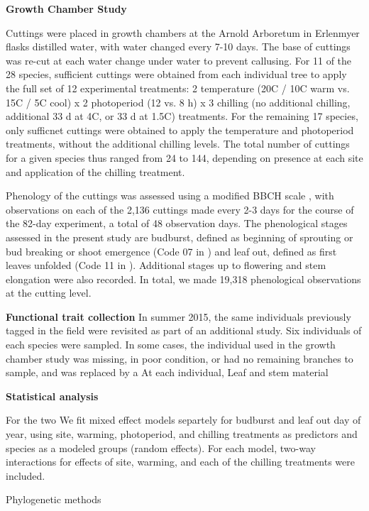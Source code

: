 \documentclass[12pt]{article}
\begin{document}
\textbf{Growth Chamber Study}

Cuttings were placed in growth chambers at the Arnold Arboretum in Erlenmyer flasks distilled water, with water changed every 7-10 days. The base of cuttings was re-cut at each water change under water to prevent callusing. For 11 of the 28 species, sufficient cuttings were obtained from each individual tree to apply the full set of 12 experimental treatments: 2 temperature (20\degree C / 10\degree C warm vs. 15\degree C / 5\degree C cool) x 2 photoperiod (12 vs. 8 h) x 3 chilling (no additional chilling,  additional 33 d at 4\degree C, or 33 d at 1.5\degree C) treatments. For the remaining 17 species, only sufficnet cuttings were obtained to apply the temperature and photoperiod treatments, without the additional chilling levels. The total number of cuttings for a given species thus ranged from 24 to 144, depending on presence at each site and application of the chilling treatment.

Phenology of the cuttings was assessed using a modified BBCH scale \cite{Finn:2007}, with observations on each of the 2,136 cuttings made every 2-3 days for the course of the 82-day experiment, a total of 48 observation days. The phenological stages assessed in the present study are budburst, defined as beginning of sprouting or bud breaking or shoot emergence (Code 07 in \cite{Finn:2007}) and leaf out, defined as first leaves unfolded (Code 11 in \cite{Finn:2007}). Additional stages up to flowering and stem elongation were also recorded. In total, we made 19,318 phenological observations at the cutting level.

\textbf{Functional trait collection}
In summer 2015, the same individuals previously tagged in the field were revisited as part of an additional study. Six individuals of each species were sampled. In some cases, the individual used in the growth chamber study was missing, in poor condition, or had no remaining branches to sample, and was replaced by a At each individual, Leaf and stem material 

\textbf{Statistical analysis}

For the two We fit mixed effect models separtely for budburst and leaf out day of year, using site, warming, photoperiod, and chilling treatments as predictors and species as a modeled groups (random effects). For each model, two-way interactions for effects of site, warming, and each of the chilling treatments were included. 

Phylogenetic methods
\end{document}
